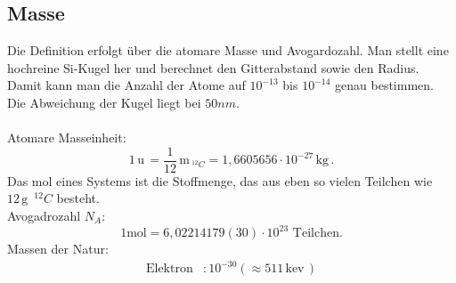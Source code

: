 \documentclass[a4paper,12pt]{article}
\numberwithin{equation}{section}
\begin{document}
\subsection{Masse}
Die Definition erfolgt über die atomare Masse und Avogardozahl. Man stellt eine hochreine Si-Kugel her und berechnet den Gitterabstand sowie den Radius. Damit kann man die Anzahl der Atome auf $10^{-13}$ bis $10^{-14}$ genau bestimmen. Die Abweichung der Kugel liegt bei $50nm$.\\\\
Atomare Masseinheit:
\[ 
        1\,\text{u}\,=\dfrac{1}{12}\,\text{m}\,_{^{12}C}=1,6605656\cdot 10^{-27}\,\text{kg}\,
.\] 
Das mol eines Systems ist die Stoffmenge, das aus eben so vielen Teilchen wie $12\,\text{g}\,$ $^{12}C$ besteht.\\
Avogadrozahl $N_{A}$:
\[ 
1\text{mol}=6,02214179\left( 30\right) \cdot 10^{23}\text{ Teilchen}
.\] 
Massen der Natur:
\begin{align*}
        \text{Elektron}&:10^{-30}\left( \approx 511\,\text{kev}\,\right) 
\end{align*}
\end{document}
